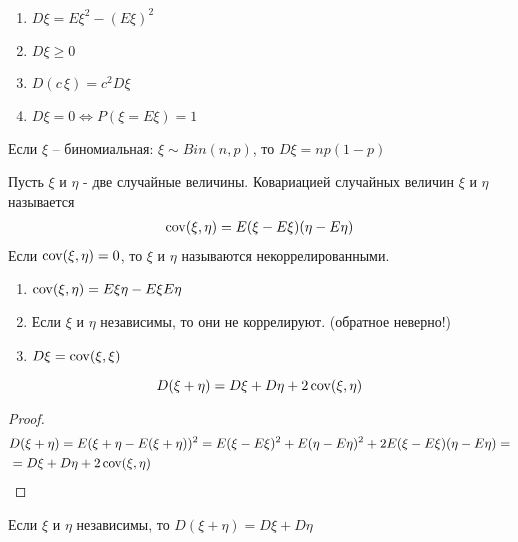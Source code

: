 \begin{lemma}~
	\begin{enumerate}
		\item $D\xi = E\xi^2 - (E\xi)^2$
		\item $D\xi \geq 0$
		\item $D(c\, \xi) = c^2 D\xi$
		\item $D\xi = 0 \Leftrightarrow P(\xi = E\xi) = 1$
	\end{enumerate}
\end{lemma}

\begin{statement}
	Если $\xi$ -- биномиальная: $\xi \sim Bin(n, p)$, то $D\xi = np (1 - p)$
\end{statement}

\begin{definition}
	Пусть $\xi$ и $\eta$ - две случайные величины. Ковариацией случайных величин $\xi$ и $\eta$ называется
	\begin{align*}
		\operatorname{cov}(\xi, \eta) = E(\xi - E\xi) (\eta - E\eta)
	\end{align*}
	Если $\operatorname{cov}(\xi, \eta) = 0$, то $\xi$ и $\eta$ называются некоррелированными.
\end{definition}

\begin{enumerate}
	\item $\operatorname{cov}(\xi, \eta) = E \xi \eta - E \xi E \eta$

	\item Если $\xi$ и $\eta$ независимы, то они не коррелируют. (обратное неверно!)

	\item $D\xi = \operatorname{cov}(\xi, \xi)$
\end{enumerate}

\begin{statement}
	\begin{equation*}
		D(\xi + \eta) = D\xi + D\eta + 2 \operatorname{cov}(\xi, \eta)
	\end{equation*}
\end{statement}

\begin{proof}
	\begin{align*}
		&D(\xi + \eta) = E(\xi + \eta - E(\xi + \eta))^2 = E(\xi - E\xi)^2 + E(\eta - E\eta)^2
		+ 2 E(\xi - E\xi)(\eta - E\eta) = \\ 
		&= D\xi + D\eta + 2 \operatorname{cov}(\xi, \eta)
	\end{align*}
\end{proof}

\begin{corollary}
	Если $\xi$ и $\eta$ независимы, то $D(\xi + \eta) = D\xi + D\eta$
\end{corollary}

